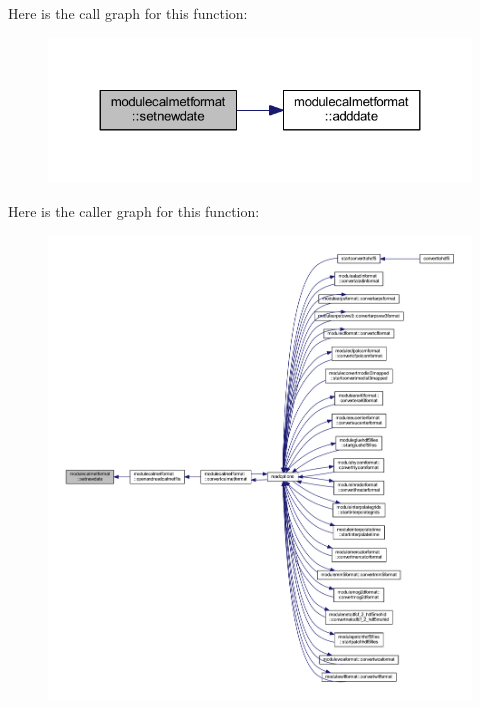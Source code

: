 Here is the call graph for this function\+:\nopagebreak
\begin{figure}[H]
\begin{center}
\leavevmode
\includegraphics[width=324pt]{namespacemodulecalmetformat_a3defaeb10661bad427bb6a70e331c077_cgraph}
\end{center}
\end{figure}
Here is the caller graph for this function\+:\nopagebreak
\begin{figure}[H]
\begin{center}
\leavevmode
\includegraphics[width=350pt]{namespacemodulecalmetformat_a3defaeb10661bad427bb6a70e331c077_icgraph}
\end{center}
\end{figure}
\mbox{\label{namespacemodulecalmetformat_a14590292a4c7892fcd59f55007069444}} 
